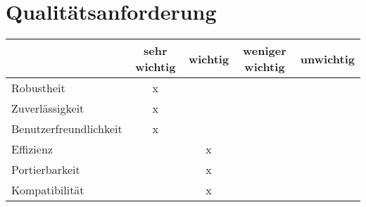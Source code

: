 \section{Qualitätsanforderung}
\begin{tabular}{|l|c|c|c|c|}
	\hline  & sehr wichtig  & wichtig & weniger wichtig & unwichtig \\ 
	\hline Robustheit  & x &  &  &  \\ 
	\hline Zuverlässigkeit & x &  &  &  \\ 
	\hline Benutzerfreundlichkeit & x &  &  &  \\ 
	\hline Effizienz &  & x &  &  \\ 
	\hline Portierbarkeit  & & x &  &  \\ 
	\hline Kompatibilität & & x &  &  \\ 
	\hline 
\end{tabular} 

